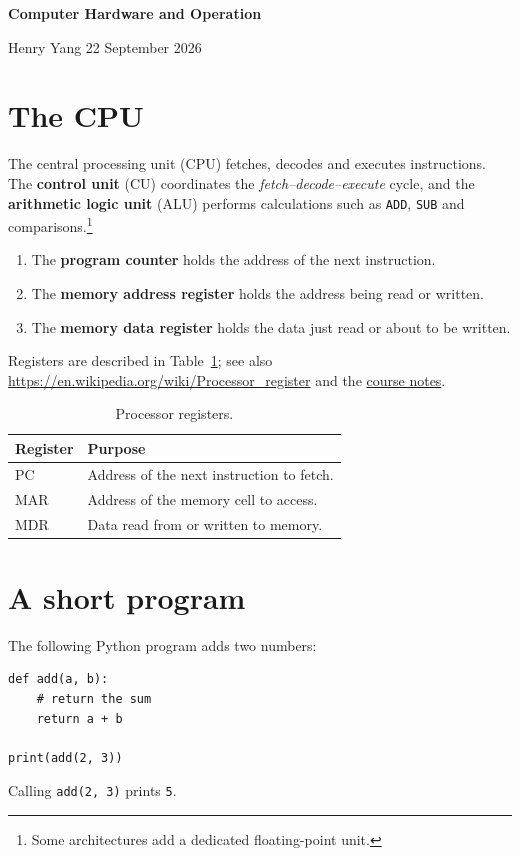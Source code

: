 \documentclass[11pt]{article}
\begin{document}
{\Large\bfseries Computer Hardware and Operation\par}
Henry Yang \hfill 22 September 2026

\section{The CPU}
The central processing unit (CPU) fetches, decodes and executes instructions. The \textbf{control unit} (CU) coordinates the \emph{fetch--decode--execute} cycle, and the \textbf{arithmetic logic unit} (ALU) performs calculations such as \texttt{ADD}, \texttt{SUB} and comparisons.\footnote{Some architectures add a dedicated floating-point unit.}

\begin{enumerate}[label=(\alph*)]
  \item The \textbf{program counter} holds the address of the next instruction.
  \item The \textbf{memory address register} holds the address being read or written.
  \item The \textbf{memory data register} holds the data just read or about to be written.
\end{enumerate}

Registers are described in Table~\ref{tab:regs}; see also \url{https://en.wikipedia.org/wiki/Processor_register} and the \href{https://example.org/notes}{course notes}.

\begin{table}[h]
\centering
\begin{tabularx}{\textwidth}{lX}
\toprule
Register & Purpose \\
\midrule
PC & Address of the next instruction to fetch. \\
MAR & Address of the memory cell to access. \\
MDR & Data read from or written to memory. \\
\bottomrule
\end{tabularx}
\caption{Processor registers.}\label{tab:regs}
\end{table}

\section{A short program}
The following Python program adds two numbers:
\begin{lstlisting}
def add(a, b):
    # return the sum
    return a + b

print(add(2, 3))
\end{lstlisting}
Calling \lstinline|add(2, 3)| prints \texttt{5}.
\end{document}
